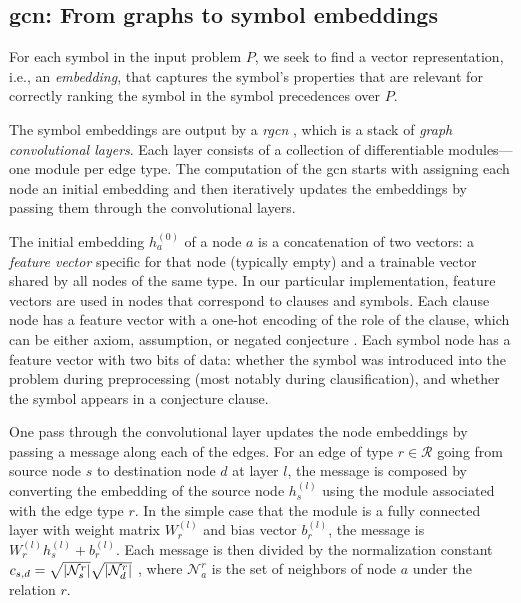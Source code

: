 \subsection{\Gls{gcn}: From graphs to symbol embeddings}
\label{sec:gcn}

For each symbol in the input problem $P$,
we seek to find a vector representation, i.e., an \emph{embedding},
that captures the symbol's properties that are relevant
for correctly ranking the symbol in the symbol precedences over $P$.

The symbol embeddings are output by a \emph{\gls{rgcn}} \cite{Schlichtkrull2017},
which is a stack of \emph{graph convolutional layers}.
Each layer consists of a collection of differentiable modules---one module per edge type.
The computation of the \gls{gcn} starts with assigning each node an initial embedding
and then iteratively updates the embeddings by passing them through the convolutional layers.

The initial embedding $h_a^{(0)}$ of a node $a$ is a concatenation of two vectors:
a \emph{feature vector} specific for that node (typically empty)
and a trainable vector shared by all nodes of the same type.
In our particular implementation,
feature vectors are used in nodes that correspond to clauses and symbols.
Each clause node has a feature vector with a one-hot encoding of the role of the clause,
which can be either axiom, assumption, or negated conjecture \cite{TptpSyntax,Sutcliffe2017}.
Each symbol node has a feature vector with two bits of data:
whether the symbol was introduced into the problem during preprocessing (most notably during clausification),
and whether the symbol appears in a conjecture clause.

One pass through the convolutional layer
updates the node embeddings by passing a message along each of the edges.
For an edge of type $r \in \mathcal{R}$ going from source node $s$ to destination node $d$ at layer $l$,
the message is composed by converting the embedding of the source node $h_s^{(l)}$
using the module associated with the edge type $r$.
In the simple case that the module is a fully connected layer with weight matrix $W_r^{(l)}$ and bias vector $b_r^{(l)}$,
the message is $W_r^{(l)} h_s^{(l)} + b_r^{(l)}$.
Each message is then divided by the normalization constant
$c_{s,d} = \sqrt{\lvert\mathcal{N}_s^r\rvert} \sqrt{\lvert\mathcal{N}_d^r\rvert}$ \cite{kipf2017semisupervised},
where $\mathcal{N}_a^r$ is the set of neighbors of node $a$ under the relation $r$.

